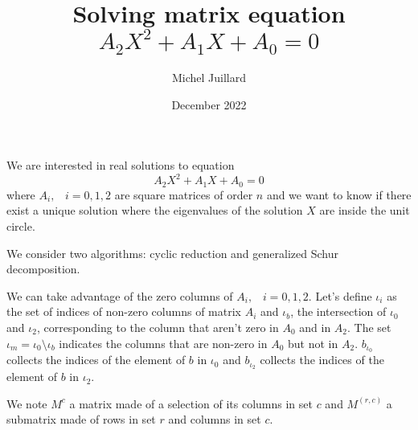 \documentclass{article}
\title{Solving matrix equation $A_2X^2 + A_1X + A_0 =0$}
\author{Michel Juillard}
\date{December 2022}
\begin{document}
\maketitle

We are interested in real solutions to equation
\[
  A_2X^2 + A_1X + A_0 =0
\]
where $A_i,\;\;\; i=0,1,2$ are square matrices of order $n$ and we
want to know if there exist a unique solution where the eigenvalues of
the solution $X$ are inside the unit circle.

We consider two algorithms: cyclic reduction and generalized Schur
decomposition.

We can take advantage of the zero columns of $A_i,\;\;\;
i=0,1,2$. Let's define $\iota_i$ as the set of indices of non-zero columns of matrix
$A_i$ and $\iota_b$, the intersection of $\iota_0$ and $\iota_2$,
corresponding to the column that aren't zero in $A_0$ and in
$A_2$. The set $\iota_m = \iota_0 \setminus \iota_b$ indicates the columns
that are non-zero in $A_0$ but not in $A_2$. $b_{\iota_0}$ collects
the indices of the element of $b$ in $\iota_0$ and $b_{\iota_2}$ collects
the indices of the element of $b$ in $\iota_2$. 

We note $M^{c}$ a matrix made of a selection of its columns in set $c$
and $M^{(r, c)}$ a submatrix made of rows in set $r$ and columns in
set $c$. 
\end{document}
